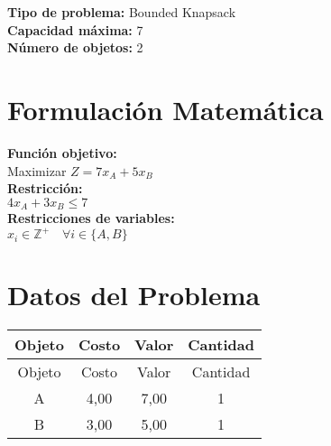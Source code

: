 \documentclass{article}
\begin{document}
\thispagestyle{empty}
\newpage
\textbf{Tipo de problema:} Bounded Knapsack\\
\textbf{Capacidad máxima:} 7\\
\textbf{Número de objetos:} 2\\

\section*{Formulación Matemática}
\textbf{Función objetivo:}\\
Maximizar $Z = 7 x_{A} + 5 x_{B}$\\

\textbf{Restricción:}\\
$4 x_{A} + 3 x_{B} \leq 7$\\

\textbf{Restricciones de variables:}\\
$x_i \in \mathbb{Z}^+ \quad \forall i \in \{A, B\}$\\
\vspace{0.5cm}

\section*{Datos del Problema}
\begin{tabular}{|c|c|c|c|}
\hline
Objeto & Costo & Valor & Cantidad \\
\hline
Objeto & Costo & Valor & Cantidad \\
\hline
A & 4,00 & 7,00 & 1 \\
B & 3,00 & 5,00 & 1 \\
\hline
\end{tabular}
\end{document}
